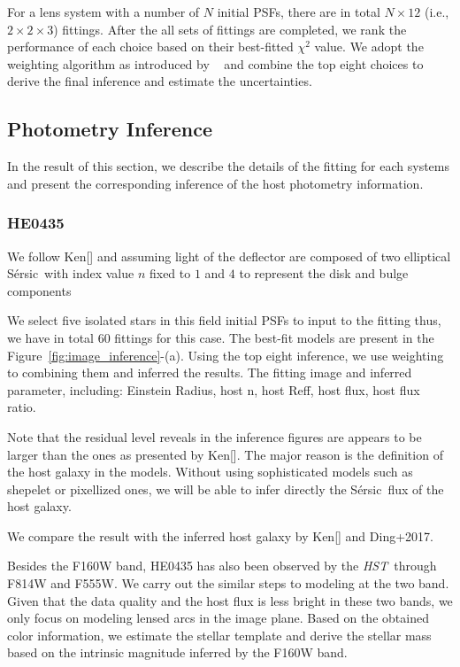 \documentclass[fleqn,usenatbib]{mnras}
\newcommand{\hst}{{\it HST}}
\newcommand{\sersic}{S\'ersic}
\begin{document}
For a lens system with a number of $N$ initial PSFs, there are in total $N\times12$ (i.e., $2 \times2 \times3$) fittings. After the all sets of fittings are completed, we rank the performance of each choice based on their best-fitted $\chi^2$ value. We adopt the weighting algorithm as introduced by ~\citet{Ding2020} and combine the top eight choices to derive the final inference and estimate the uncertainties.

\subsection{Photometry Inference}
In the result of this section, we describe the details of the fitting for each systems and present the corresponding inference of the host photometry information. 

\subsubsection{HE0435}
We follow Ken[] and assuming light of the deflector are composed of two elliptical \sersic\ with index value $n$ fixed to $1$ and $4$ to represent the disk and bulge components

We select five isolated stars in this field initial PSFs to input to the fitting thus, we have in total 60 fittings for this case. The best-fit models are present in the Figure~\ref{fig:image_inference}-(a). Using the top eight inference, we use weighting to combining them and inferred the results. 
The fitting image and inferred parameter, including: Einstein Radius, host n, host Reff, host flux, host flux ratio.

Note that the residual level reveals in the inference figures are appears to be larger than the ones as presented by Ken[]. The major reason is the definition of the host galaxy in the models. Without using sophisticated models such as shepelet or pixellized ones, we will be able to infer directly the \sersic\ flux of the host galaxy.

We compare the result with the inferred host galaxy by Ken[] and Ding+2017.

Besides the F160W band, HE0435 has also been observed by the \hst\ through F814W and F555W. We carry out the similar steps to modeling at the two band. Given that the data quality and the host flux is less bright in these two bands, we only focus on modeling lensed arcs in the image plane. Based on the obtained color information, we estimate the stellar template and derive the stellar mass based on the intrinsic magnitude inferred by the F160W band.
\end{document}
